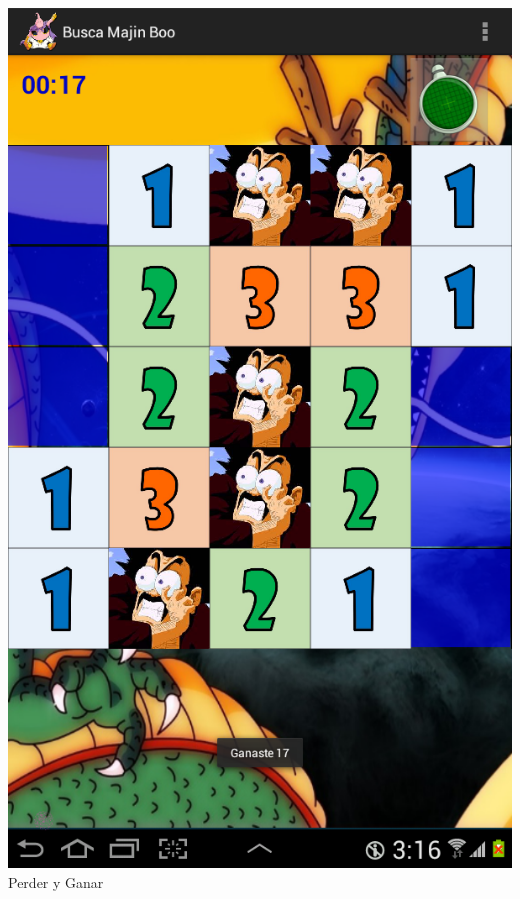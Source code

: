 \documentclass[11pt]{article} %
\begin{document}
\begin{itemize}
\begin{center}
\includegraphics[scale=0.2]{Imagenes/SSGanar.png}\\
Perder y Ganar
\end{center}
\end {itemize}
\end{document}
